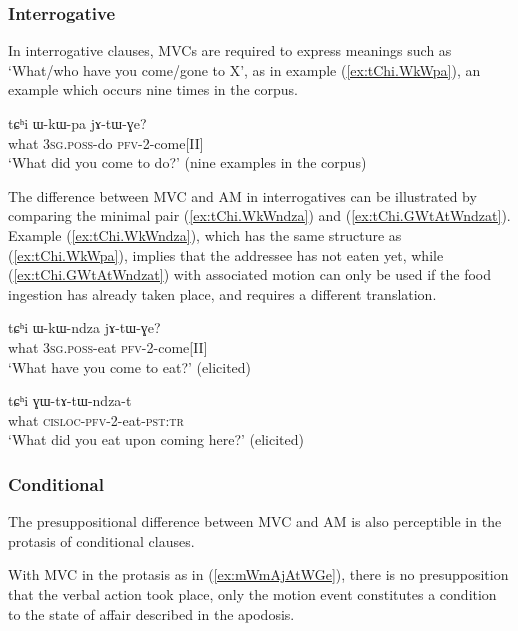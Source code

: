  

\subsubsection{Interrogative} \label{sec:am.interrogative}
In interrogative clauses, MVCs are required to express meanings such as `What/who have you come/gone to X', as in example (\ref{ex:tChi.WkWpa}), an example which occurs nine times in the corpus.

\begin{exe}
\ex \label{ex:tChi.WkWpa}
\gll tɕʰi ɯ-kɯ-pa jɤ-tɯ-ɣe? \\
what \textsc{3sg.poss}-do \textsc{pfv}-2-come[II] \\
\glt `What did you come to do?' (nine examples in the corpus)
\end{exe}

The difference between MVC and AM in interrogatives can be illustrated by comparing the minimal pair  (\ref{ex:tChi.WkWndza}) and (\ref{ex:tChi.GWtAtWndzat}). Example (\ref{ex:tChi.WkWndza}), which has the same structure as (\ref{ex:tChi.WkWpa}), implies that the addressee has not eaten yet, while (\ref{ex:tChi.GWtAtWndzat}) with associated motion can only be used if the food ingestion has already taken place, and requires a different translation.

\begin{exe}
\ex \label{ex:tChi.WkWndza}
\gll tɕʰi ɯ-kɯ-ndza jɤ-tɯ-ɣe? \\
what \textsc{3sg.poss}-eat \textsc{pfv}-2-come[II] \\
\glt `What have you come to eat?' (elicited)
\end{exe}

\begin{exe}
\ex \label{ex:tChi.GWtAtWndzat}
\gll tɕʰi ɣɯ-tɤ-tɯ-ndza-t \\
what \textsc{cisloc}-\textsc{pfv}-2-eat-\textsc{pst:tr}    \\
\glt `What did you eat upon coming here?' (elicited)
\end{exe}

\subsubsection{Conditional} \label{sec:am.conditional}
The presuppositional difference between MVC and AM is also perceptible in the protasis of conditional clauses. 

With MVC in the protasis as in (\ref{ex:mWmAjAtWGe}), there is no presupposition that the verbal action took place, only the motion event constitutes a condition to the state of affair described in the apodosis.

